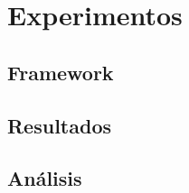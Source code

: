 \chapter[Capítulo 6. Experimentos]{Experimentos}

\section{Framework}

\section{Resultados}

\section{Análisis}

\newpage












